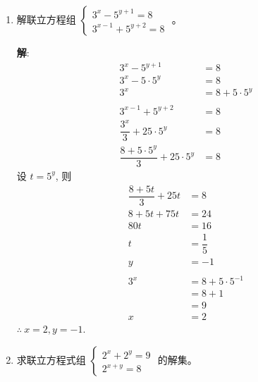 \documentclass{report}
\newcommand{\sol}{\vspace{0.2cm}\textbf{解}:}
\begin{document}
\begin{multicols*}{2}
\begin{enumerate}[leftmargin=*]
        \item 解联立方程组 $\left\{\begin{array}{c}3^x-5^{y+1}=8 \\ 3^{x-1}+5^{y+2}=8\end{array}\right.$ 。

              \sol{}
              \begin{align*}
                  3^x - 5^{y+1}                             & = 8               \\
                  3^x - 5 \cdot 5^y                         & = 8               \\
                  3^x                                       & = 8 + 5 \cdot 5^y \\
                  \\
                  3^{x-1} + 5^{y+2}                         & = 8               \\
                  \dfrac{3^x}{3} + 25 \cdot 5^y             & = 8               \\
                  \dfrac{8 + 5 \cdot 5^y}{3} + 25 \cdot 5^y & = 8
              \end{align*}
              设 $t = 5^y$, 则
              \begin{align*}
                  \dfrac{8 + 5t}{3} + 25t & = 8                  \\
                  8 + 5t + 75t            & = 24                 \\
                  80t                     & = 16                 \\
                  t                       & = \dfrac{1}{5}       \\
                  y                       & = -1                 \\
                  \\
                  3^x                     & = 8 + 5 \cdot 5^{-1} \\
                                          & = 8 + 1              \\
                                          & = 9                  \\
                  x                       & = 2
              \end{align*}
              $\therefore\ x = 2, y = -1$.

        \item 求联立方程式组 $\left\{\begin{array}{r}2^x+2^y=9 \\ 2^{x+y}=8\end{array}\right.$ 的解集。


\end{enumerate}
\end{multicols*}
\end{document}
